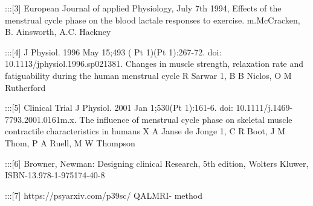 \documentclass[
  letterpaper,
  DIV=11,
  numbers=noendperiod]{scrreprt}
\begin{document}
:::{[}3{]} European Journal of applied Physiology, July 7th 1994,
Effects of the menstrual cycle phase on the blood lactale responses to
exercise. m.McCracken, B. Ainsworth, A.C. Hackney

:::{[}4{]} J Physiol. 1996 May 15;493 ( Pt 1)(Pt 1):267-72. doi:
10.1113/jphysiol.1996.sp021381. Changes in muscle strength, relaxation
rate and fatiguability during the human menstrual cycle R Sarwar 1, B B
Niclos, O M Rutherford

:::{[}5{]} Clinical Trial J Physiol. 2001 Jan 1;530(Pt 1):161-6. doi:
10.1111/j.1469-7793.2001.0161m.x. The influence of menstrual cycle phase
on skeletal muscle contractile characteristics in humans X A Janse de
Jonge 1, C R Boot, J M Thom, P A Ruell, M W Thompson

:::{[}6{]} Browner, Newman: Designing clinical Research, 5th edition,
Wolters Kluwer, ISBN-13.978-1-975174-40-8

:::{[}7{]} https://psyarxiv.com/p39sc/ QALMRI- method
\end{document}
